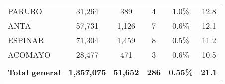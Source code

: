 \begin{tabular}{lccccc}
	\cellcolor[HTML]{FFFF99}PARURO                                  & 31,264               & 389                                  & 4                    & 1.0\%                      & 12.8                                        \\
	\cellcolor[HTML]{FFFF99}ANTA                                    & 57,731               & 1,126                                & 7                    & 0.6\%                      & 12.1                                        \\
	\cellcolor[HTML]{FFFF99}ESPINAR                                 & 71,304               & 1,459                                & 8                    & 0.5\%                      & 11.2                                        \\
	\cellcolor[HTML]{FFFF99}ACOMAYO                                 & 28,477               & 471                                  & 3                    & 0.6\%                      & 10.5                                        \\
	& \multicolumn{1}{l}{} & \multicolumn{1}{l}{}                 & \multicolumn{1}{l}{} & \multicolumn{1}{l}{}       & \multicolumn{1}{l}{}                        \\
	\rowcolor[HTML]{DDEBF7} 
	\textbf{Total general}                                          & \textbf{1,357,075}   & \textbf{51,652}                      & \textbf{286}         & \textbf{0.55\%}            & \textbf{21.1}                              
\end{tabular}